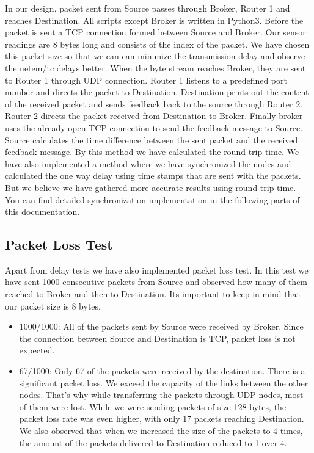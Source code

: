 \documentclass[conference]{IEEEtran}
\begin{document}
In our design, packet sent from Source passes through Broker, Router 1 and reaches Destination. All scripts except Broker is written in Python3. Before the packet is sent a TCP connection formed between Source and Broker. Our sensor readings are 8 bytes long and consists of the index of the packet. We have chosen this packet size so that we can can minimize the transmission delay and observe the netem/tc delays better. When the byte stream reaches Broker, they are sent to Router 1 through UDP connection. Router 1 listens to a predefined port number and directs the packet to Destination. Destination prints out the content of the received packet and sends feedback back to the source through Router 2. Router 2 directs the packet received from Destination to Broker. Finally broker uses the already open TCP connection to send the feedback message to Source. Source calculates the time difference between the sent packet and the received feedback message. By this method we have calculated the round-trip time. We have also implemented a method where we have synchronized the nodes and calculated the one way delay using time stamps that are sent with the packets. But we believe we have gathered more accurate results using round-trip time. You can find detailed synchronization implementation in the following parts of this documentation.

\subsection{Packet Loss Test}\label{AA}

Apart from delay tests we have also implemented packet loss test. In this test we have sent 1000 consecutive packets from Source and observed how many of them reached to Broker and then to Destination. Its important to keep in mind that our packet size is 8 bytes. 
\begin{itemize}
\item 1000/1000: All of the packets sent by Source were received by Broker. Since the connection between Source and Destination is TCP, packet loss is not expected.
\item 67/1000: Only 67 of the packets were received by the destination. There is a significant packet loss. We exceed the capacity of the links between the other nodes. That's why while transferring the packets through UDP nodes, most of them were lost. While we were sending packets of size 128 bytes, the packet loss rate was even higher, with only 17 packets reaching Destination. We also observed that when we increased the size of the packets to 4 times, the amount of the packets delivered to Destination reduced to 1 over 4.
\end{itemize}
\end{document}
